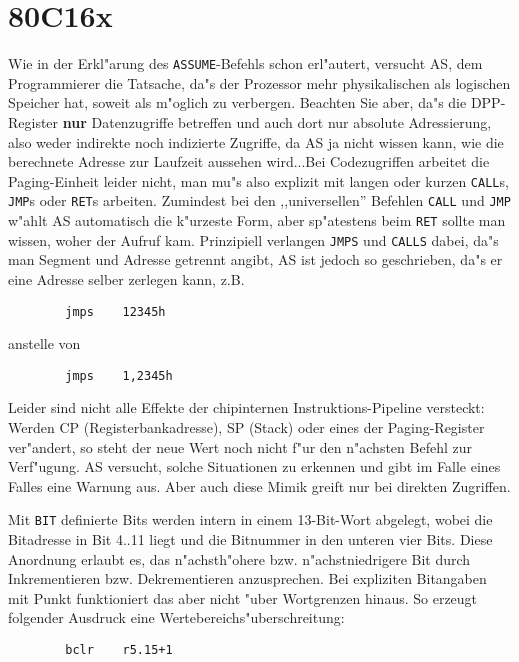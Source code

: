 \documentclass[12pt,a4paper,twoside]{report}
\newcommand{\bb}[1]{{\bf #1}}
\newcommand{\tty}[1]{{\tt #1}}
\begin{document}

\section{80C16x}

Wie in der Erkl"arung des \tty{ASSUME}-Befehls schon erl"autert, versucht
AS, dem Programmierer die Tatsache, da"s der Prozessor mehr physikalischen
als logischen Speicher hat, soweit als m"oglich zu verbergen.  Beachten
Sie aber, da"s die DPP-Register \bb{nur} Datenzugriffe betreffen und auch dort
nur absolute Adressierung, also weder indirekte noch indizierte Zugriffe,
da AS ja nicht wissen kann, wie die berechnete Adresse zur Laufzeit
aussehen wird...Bei Codezugriffen arbeitet die Paging-Einheit leider nicht,
man mu"s also explizit mit langen oder kurzen \tty{CALL}s, \tty{JMP}s oder
\tty{RET}s arbeiten.  Zumindest bei den ,,universellen'' Befehlen \tty{CALL}
und \tty{JMP} w"ahlt AS automatisch die k"urzeste Form, aber sp"atestens
beim \tty{RET} sollte man wissen, woher der Aufruf kam.  Prinzipiell
verlangen \tty{JMPS} und \tty{CALLS} dabei, da"s man Segment und Adresse
getrennt angibt, AS ist jedoch so geschrieben, da"s er eine Adresse selber
zerlegen kann, z.B.
\begin{verbatim}
        jmps    12345h
\end{verbatim}
anstelle von
\begin{verbatim}
        jmps    1,2345h
\end{verbatim}
Leider sind nicht alle Effekte der chipinternen Instruktions-Pipeline
versteckt: Werden CP (Registerbankadresse), SP (Stack) oder eines der
Paging-Register ver"andert, so steht der neue Wert noch nicht f"ur den
n"achsten Befehl zur Verf"ugung.  AS versucht, solche Situationen zu
erkennen und gibt im Falle eines Falles eine Warnung aus.  Aber auch
diese Mimik greift nur bei direkten Zugriffen.
\par
Mit \tty{BIT} definierte Bits werden intern in einem 13-Bit-Wort abgelegt,
wobei die Bitadresse in Bit 4..11 liegt und die Bitnummer in den unteren
vier Bits.  Diese Anordnung erlaubt es, das n"achsth"ohere bzw.
n"achstniedrigere Bit durch Inkrementieren bzw. Dekrementieren anzusprechen.
Bei expliziten Bitangaben mit Punkt funktioniert das aber nicht "uber
Wortgrenzen hinaus.  So erzeugt folgender Ausdruck eine
Wertebereichs"uberschreitung:
\begin{verbatim}
        bclr    r5.15+1
\end{verbatim}
\end{document}

